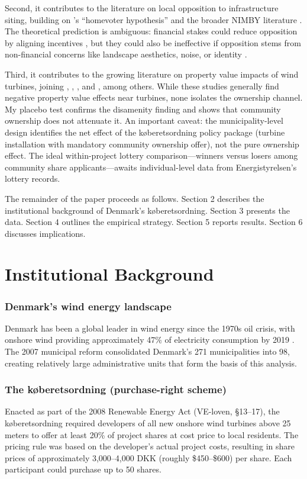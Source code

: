 \documentclass[12pt]{article}
\begin{document}
Second, it contributes to the literature on local opposition to infrastructure siting, building on \citet{Fischel2001}'s ``homevoter hypothesis'' and the broader NIMBY literature \citep{DearWolch1992, SchivelyChristensen2007}. The theoretical prediction is ambiguous: financial stakes could reduce opposition by aligning incentives \citep{Coase1960, Dixit1996}, but they could also be ineffective if opposition stems from non-financial concerns like landscape aesthetics, noise, or identity \citep{DevineWright2009, VanderHorst2007}.

Third, it contributes to the growing literature on property value impacts of wind turbines, joining \citet{GielissenHoen2024}, \citet{Droller2024}, \citet{Hoen2015}, and \citet{SunakawaYamazaki2023}, among others. While these studies generally find negative property value effects near turbines, none isolates the ownership channel. My placebo test confirms the disamenity finding and shows that community ownership does not attenuate it. An important caveat: the municipality-level design identifies the net effect of the k{\o}beretsordning policy package (turbine installation with mandatory community ownership offer), not the pure ownership effect. The ideal within-project lottery comparison---winners versus losers among community share applicants---awaits individual-level data from Energistyrelsen's lottery records.

The remainder of the paper proceeds as follows. Section 2 describes the institutional background of Denmark's k{\o}beretsordning. Section 3 presents the data. Section 4 outlines the empirical strategy. Section 5 reports results. Section 6 discusses implications.


\section{Institutional Background}

\subsubsection*{Denmark's wind energy landscape} Denmark has been a global leader in wind energy since the 1970s oil crisis, with onshore wind providing approximately 47\% of electricity consumption by 2019 \citep{DEA2020}. The 2007 municipal reform consolidated Denmark's 271 municipalities into 98, creating relatively large administrative units that form the basis of this analysis.

\subsubsection*{The k{\o}beretsordning (purchase-right scheme)} Enacted as part of the 2008 Renewable Energy Act (VE-loven, \S13--17), the k{\o}beretsordning required developers of all new onshore wind turbines above 25 meters to offer at least 20\% of project shares at cost price to local residents. The pricing rule was based on the developer's actual project costs, resulting in share prices of approximately 3,000--4,000 DKK (roughly \$450--\$600) per share. Each participant could purchase up to 50 shares.
\end{document}
